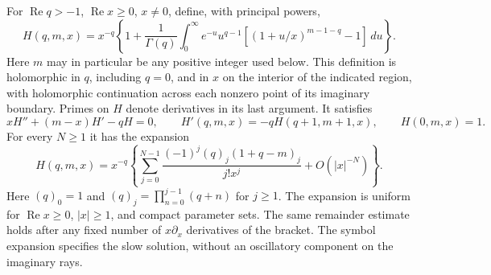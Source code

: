 \begin{lemma}\label{free:slow}
For $\operatorname{Re}q>-1$, $\operatorname{Re}x\ge0$, $x\ne0$, define, with
principal powers,
\begin{equation}\label{free:H-definition}
 H(q,m,x)=x^{-q}\left\{1+\frac1{\Gamma(q)}
 \int_0^\infty e^{-u}u^{q-1}
 \left[(1+u/x)^{m-1-q}-1\right]\,du\right\}.
\end{equation}
Here $m$ may in particular be any positive integer used below.  This
definition is holomorphic in $q$, including $q=0$, and in $x$ on the
interior of the indicated region, with holomorphic continuation across
each nonzero point of its imaginary boundary.  Primes on $H$ denote
derivatives in its last argument.  It satisfies
\begin{equation}\label{free:H-equation}
 xH''+(m-x)H'-qH=0,\qquad
 H'(q,m,x)=-qH(q+1,m+1,x),\qquad H(0,m,x)=1.
\end{equation}
For every $N\ge1$ it has the expansion
\begin{equation}\label{free:H-expansion}
 H(q,m,x)=x^{-q}\left\{
 \sum_{j=0}^{N-1}\frac{(-1)^j(q)_j(1+q-m)_j}{j!x^j}
 +O(|x|^{-N})\right\}.
\end{equation}
Here $(q)_0=1$ and $(q)_j=\prod_{n=0}^{j-1}(q+n)$ for $j\ge1$.
The expansion is uniform for $\operatorname{Re}x\ge0$, $|x|\ge1$, and compact parameter
sets.  The same remainder estimate holds after any fixed number of
$x\partial_x$ derivatives of the bracket.  The symbol expansion specifies
the slow solution, without an oscillatory component on the imaginary
rays.
\end{lemma}

